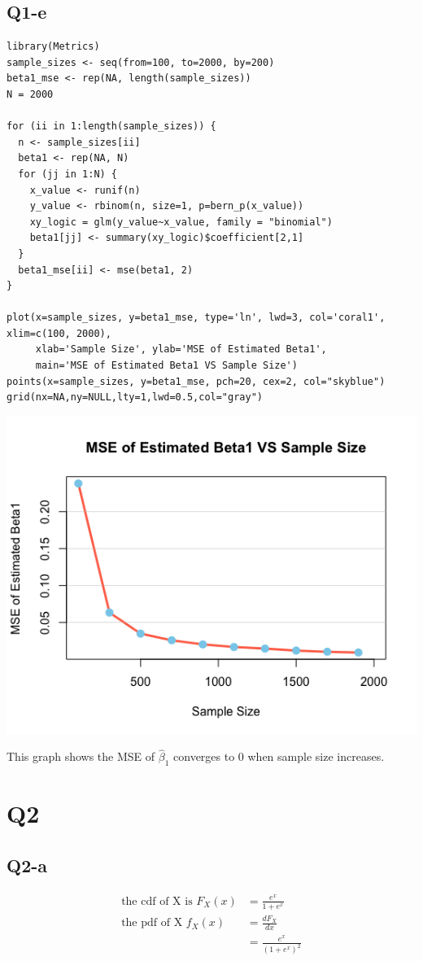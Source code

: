 \documentclass[12pt,letterpaper]{article}
\let\hat\widehat
\begin{document}
\subsection*{Q1-e}
\begin{verbatim}
library(Metrics)
sample_sizes <- seq(from=100, to=2000, by=200)
beta1_mse <- rep(NA, length(sample_sizes))
N = 2000

for (ii in 1:length(sample_sizes)) {
  n <- sample_sizes[ii]
  beta1 <- rep(NA, N)
  for (jj in 1:N) {
    x_value <- runif(n)
    y_value <- rbinom(n, size=1, p=bern_p(x_value))
    xy_logic = glm(y_value~x_value, family = "binomial")
    beta1[jj] <- summary(xy_logic)$coefficient[2,1]
  }
  beta1_mse[ii] <- mse(beta1, 2)
}

plot(x=sample_sizes, y=beta1_mse, type='ln', lwd=3, col='coral1', xlim=c(100, 2000),
     xlab='Sample Size', ylab='MSE of Estimated Beta1', 
     main='MSE of Estimated Beta1 VS Sample Size')
points(x=sample_sizes, y=beta1_mse, pch=20, cex=2, col="skyblue")
grid(nx=NA,ny=NULL,lty=1,lwd=0.5,col="gray")
\end{verbatim}

\includegraphics[width=150mm]{mse_samplesize.png}

\noindent This graph shows the MSE of $\hat{\beta}_1$ converges to 0 when sample size increases.

\newpage
\section*{Q2}
\subsection*{Q2-a}
\begin{align*}
\text{the cdf of X is }F_X(x) &= \frac{e^x}{1+e^x} \\
\text{the pdf of X } f_X(x) &= \frac{d F_X}{dx} \\
&= \frac{e^x}{(1 + e^x)^2}
\end{align*}
\end{document}
